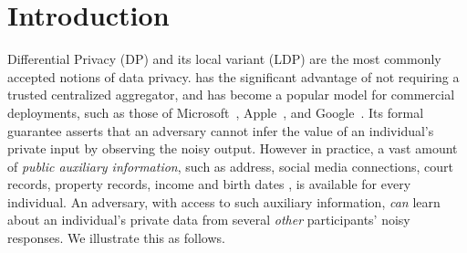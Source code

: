 \section{Introduction}
\label{sec:intro}
Differential Privacy (\textsf{DP}) and its local variant (\textsf{LDP}) are the most commonly accepted notions of data privacy. \ldp has the significant advantage of not requiring a trusted centralized aggregator, and has become a popular model for commercial deployments, such as those of Microsoft~\citep{Microsoft}, Apple~\citep{Apple}, and Google~\citep{Rappor1,Rappor2,Prochlo}. Its formal guarantee asserts that an adversary cannot infer the value of an individual's private input by observing the noisy output. However in practice, a vast amount of \textit{public auxiliary information}, such as address, social media connections, %
court records, property records, %
income and birth dates \citep{birth}, is available for every individual. An adversary, with access to such auxiliary information, \emph{can} learn about an individual's private data from several \emph{other} participants' noisy responses. We illustrate this as follows.%


